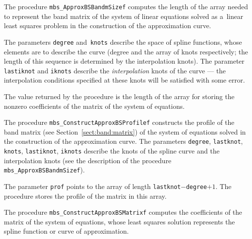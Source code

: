 \vspace{\bigskipamount}
The procedure \texttt{mbs\_ApproxBSBandmSizef} computes the length of
the array needed to represent the band matrix of the system of linear
equations solved as a~linear least squares problem in the construction
of the approximation curve.

The parameters \texttt{degree} and~\texttt{knots} describe
the space of spline functions, whose elements are to describe the curve
(degree and the array of knots respectively; the length of this sequence
is determined by the interpolation knots).
The parameter \texttt{lastiknot} and \texttt{iknots} describe the
\emph{interpolation} knots of the curve --- the interpolation conditions
specified at these knots will be satisfied with some error.

The value returned by the procedure is the length of the array
for storing the nonzero coefficients of the matrix of the system
of equations.

\vspace{\bigskipamount}
The procedure \texttt{mbs\_ConstructApproxBSProfilef} constructs the profile
of the band matrix (see Section~\ref{sect:band:matrix}) of the system of
equations solved in the construction of the approximation curve.
The parameters \texttt{degree}, \texttt{lastknot}, \texttt{knots},
\texttt{lastiknot}, \texttt{iknots} describe the knots of the spline curve
and the interpolation knots (see the description of the procedure
\texttt{mbs\_ApproxBSBandmSizef}).

The parameter \texttt{prof} points to the array of length
\texttt{lastknot}$-$\texttt{degree}$+1$. The procedure stores the profile
of the matrix in this array.

\vspace{\bigskipamount}
\begin{sloppypar}
The procedure \texttt{mbs\_ConstructApproxBSMatrixf} computes the coefficients
of the matrix of the system of equations, whose least squares solution
represents the spline function or curve of approximation.
\end{sloppypar}

